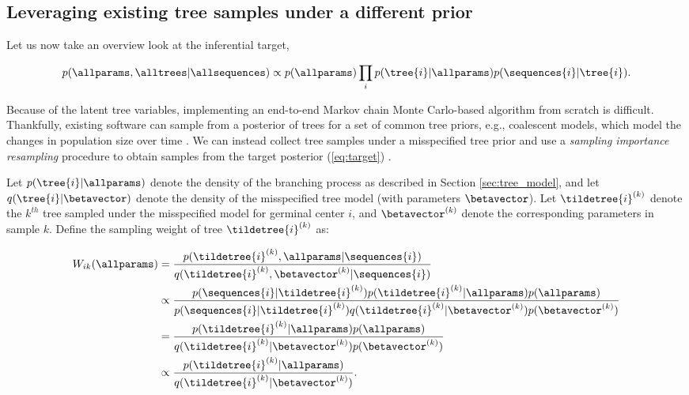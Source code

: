 \subsection{Leveraging existing tree samples under a different prior} \label{sec:sir}

Let us now take an overview look at the inferential target,

\begin{equation} \label{eq:target}
p(\allparams, \alltrees | \allsequences) \propto p(\allparams) \prod_i  p(\tree{i} | \allparams) p(\sequences{i} | \tree{i}) .
\end{equation}

Because of the latent tree variables, implementing an end-to-end Markov chain Monte Carlo-based algorithm from scratch is difficult.
Thankfully, existing software can sample from a posterior of trees for a set of common tree priors, e.g., coalescent models, which model the changes in population size over time \citep{donnelly1995coalescents, minin2008smooth}.
We can instead collect tree samples under a misspecified tree prior and use a \textit{sampling importance resampling} procedure to obtain samples from the target posterior (\ref{eq:target}) \citep{gordon1993novel}.

Let $p(\tree{i} | \allparams)$ denote the density of the branching process as described in Section \ref{sec:tree_model}, and let $q(\tree{i} | \betavector)$ denote the density of the misspecified tree model (with parameters $\betavector$).
Let $\tildetree{i}^{(k)}$ denote the $k^{th}$ tree sampled under the misspecified model for germinal center $i$, and $\betavector^{(k)}$ denote the corresponding parameters in sample $k$.
Define the sampling weight of tree $\tildetree{i}^{(k)}$ as:

\begin{equation} \label{eq:sir_weight}
\begin{aligned}
W_{ik}(\allparams)
&= \frac{p(\tildetree{i}^{(k)}, \allparams | \sequences{i})}{q(\tildetree{i}^{(k)}, \betavector^{(k)} | \sequences{i})} \\
&\propto \frac{p(\sequences{i} | \tildetree{i}^{(k)}) p(\tildetree{i}^{(k)} | \allparams) p(\allparams)}{p(\sequences{i} | \tildetree{i}^{(k)}) q(\tildetree{i}^{(k)} | \betavector^{(k)}) p(\betavector^{(k)})} \\
&= \frac{p(\tildetree{i}^{(k)} | \allparams) p(\allparams)}{q(\tildetree{i}^{(k)} | \betavector^{(k)}) p(\betavector^{(k)})} \\
&\propto \frac{p(\tildetree{i}^{(k)} | \allparams)}{q(\tildetree{i}^{(k)} | \betavector^{(k)})} .
\end{aligned}
\end{equation}

